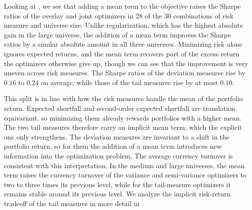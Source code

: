 \begin{table}[htbp]
  \caption{Change in the out-of-sample Sharpe ratio of the overlay and joint optimizers from adding a mean term in the small, medium, and large investable universes. Panel A reports the absolute change, the Sharpe ratio of each mean-risk optimizer in  minus that of the same unregularized optimizer without a mean term in , and Panel B the relative change in percent of the latter. Rows correspond to the risk measure in the objective, and the last two rows of each panel report the change of the average Sharpe ratio across the deviation measures (variance, semi-variance, and MAD) and across the tail measures (ES and SOES). The relative changes in the small universe are large because several Sharpe ratios without a mean term are close to zero.}
  \label{tab:mean-sharpe-change}
\end{table}

Looking at , we see that adding a mean term to the objective raises the Sharpe ratios of the overlay and joint optimizers in 28 of the 30 combinations of risk
measure and universe size. Unlike regularization, which has the highest absolute gain in the large universe, the addition of a mean
term improves the Sharpe ratios by a similar absolute amount in all three universes. Minimizing risk alone ignores expected returns, and the mean term recovers part
of the excess return the optimizers otherwise give up, though we can see that the improvement is very uneven across
risk measures. The Sharpe ratios of the deviation measures rise by $0.16$ to $0.24$ on average, while those of the tail
measures rise by at most $0.10$.

This split is in line with how the risk measures handle the mean of the portfolio return. Expected shortfall and
second-order expected shortfall are translation equivariant, so minimizing them already rewards portfolios with a higher mean. The two tail measures therefore
carry an implicit mean term, which the explicit one only strengthens. The deviation measures are invariant to a shift in
the portfolio return, so for them the addition of a mean term introduces new information into the optimization problem. The average currency turnover is
consistent with this interpretation. In the medium and large universes, the mean term raises the currency turnover of
the variance and semi-variance optimizers to two to three times its previous level, while for the tail-measure
optimizers it remains stable around its previous level. We analyze the implicit risk-return tradeoff of the tail measures in more detail in
.

